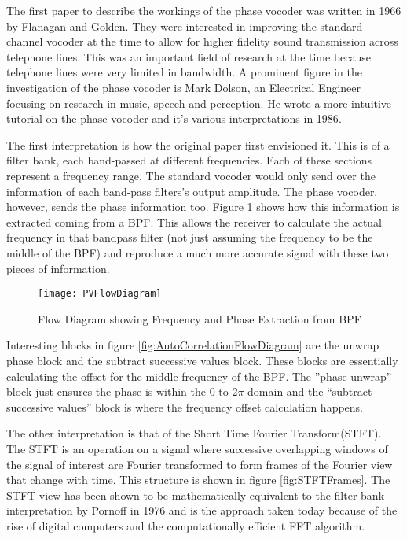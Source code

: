 The first paper to describe the workings of the phase vocoder was written in 1966
by Flanagan and Golden\cite{OriginalPhaseVocoder}. They were interested in
improving the standard channel vocoder at the time to allow for higher fidelity
sound transmission across telephone lines. This was an important field of research
at the time because telephone lines were very limited in bandwidth. A prominent
figure in the investigation of the phase vocoder is Mark Dolson, an Electrical
Engineer focusing on research in music, speech and perception. He wrote a more
intuitive tutorial on the phase vocoder and it's various interpretations in
1986\cite{DolsonTutorial}.

The first interpretation is how the original paper first envisioned it. This is of
a filter bank, each band-passed at different frequencies. Each of these sections
represent a frequency range. The standard vocoder would only send over the
information of each band-pass filters's output amplitude. The phase vocoder,
however, sends the phase information too. Figure \ref{fig:PVFlowDiagram} shows how
this information is extracted coming from a BPF. This allows the receiver to
calculate the actual frequency in that bandpass filter (not just assuming the
frequency to be the middle of the BPF) and reproduce a much more accurate signal
with these two pieces of information.

\begin{figure}[h]
	\texttt{[image: PVFlowDiagram]}
	\caption{Flow Diagram showing Frequency and Phase Extraction from
	BPF\cite{OriginalPhaseVocoder}}
	\label{fig:PVFlowDiagram}
\end{figure}

Interesting blocks in figure \ref{fig:AutoCorrelationFlowDiagram} are the unwrap
phase block and the subtract successive values block. These blocks are essentially
calculating the offset for the middle frequency of the BPF. The ''phase unwrap''
block just ensures the phase is within the 0 to $2\pi$ domain and the ``subtract
successive values'' block is where the frequency offset calculation happens.

The other interpretation is that of the Short Time Fourier Transform(STFT). The
STFT is an operation on a signal where successive overlapping windows of the
signal of interest are Fourier transformed to form frames of the Fourier view that
change with time. This structure is shown in figure \ref{fig:STFTFrames}. The STFT
view has been shown to be mathematically equivalent to the filter bank
interpretation by Pornoff in 1976\cite{STFTPhaseVocoder} and is the approach taken
today because of the rise of digital computers and the computationally efficient
FFT algorithm.


